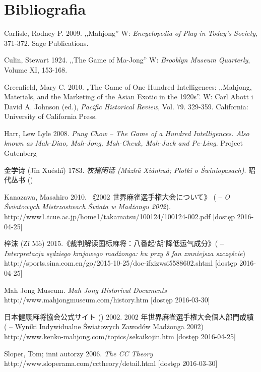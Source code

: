 \onecolumn
\section*{Bibliografia}
Carlisle, Rodney P. 2009. ,,Mahjong'' W: \textit{Encyclopedia of Play in Today's
Society}, 371-372.
Sage Publications.

Culin, Stewart 1924. ,,The Game of Ma-Jong'' W: \textit{Brooklyn Museum
Quarterly}, Volume XI, 153-168.


Greenfield, Mary C. 2010. „The Game of One Hundred Intelligences: ,,Mahjong,
Materials, and the Marketing of the Asian Exotic in the 1920s''. W: Carl Abott i
David A. Johnson (ed.), \textit{Pacific Historical Review}, Vol. 79. 329-359.
California: University of California Press.

Harr, Lew Lyle 2008. \textit{Pung Chow -- The Game of a Hundred Intelligences.
Also known as Mah-Diao, Mah-Jong, Mah-Cheuk, Mah-Juck and Pe-Ling}. Project
Gutenberg

金学诗 (Jīn Xuéshī) 1783. \textit{牧猪闲话 (Mùzhū Xiánhuà; Plotki o Świniopasach)}.
昭代丛书 ()

Kanazawa, Masahiro 2010. 《2002 世界麻雀選手権大会について》 ( -- \textit{O Światowych Mistrzostwach Świata w Madżongu
2002}).
\\http://www1.tcue.ac.jp/home1/takamatsu/100124/100124-002.pdf [dostęp
2016-04-25]

梓沫 (Zǐ Mò) 2015.《裁判解读国标麻将：八番起‘胡’降低运气成分》( -- \textit{Interpretacja sędziego krajowego madżonga:
hu przy 8 fan zmniejsza szczęście}) %
\\http://sports.sina.com.cn/go/2015-10-25/doc-ifxizwsi5588602.shtml [dostęp 2016-04-25]

Mah Jong Museum. \textit{Mah Jong Historical Documents}
\\http://www.mahjongmuseum.com/history.htm [dostęp
2016-03-30]


日本健康麻将協会公式サイト () 2002.
2002 年世界麻雀選手権大会個人部門成績 ( -- Wyniki Indywidualne Światowych Zawodów Madżonga
2002) \\http://www.kenko-mahjong.com/topics/sekaikojin.htm [dostęp 2016-04-25]

Sloper, Tom; inni autorzy 2006. \textit{The CC Theory}
\\http://www.sloperama.com/cctheory/detail.html [dostęp
2016-03-30]

